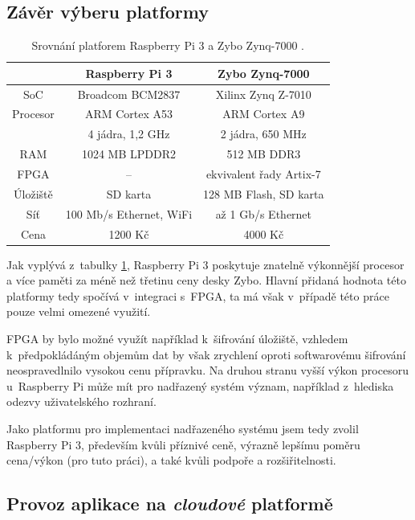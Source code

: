 \subsection{Závěr výberu platformy}

\begin{table}[h!]
\centering
\begin{tabular}{|c | c | c |} 
 \hline
 & \textbf{Raspberry Pi 3} & \textbf{Zybo Zynq-7000} \\
 \hline 
 SoC & Broadcom BCM2837 & Xilinx Zynq Z-7010 \\ 
 Procesor & ARM Cortex A53 & ARM Cortex A9 \\
 & 4 jádra, 1,2 GHz & 2 jádra, 650 MHz \\
 RAM & 1024 MB LPDDR2 & 512 MB DDR3 \\
 FPGA & -- & ekvivalent řady Artix-7 \\
 Úložiště & SD karta & 128 MB Flash, SD karta \\
 Síť & 100 Mb/s Ethernet, WiFi & až 1 Gb/s Ethernet \\
 Cena & 1200 Kč & 4000 Kč \\
 \hline
\end{tabular}
\caption[Srovnání platforem Raspberry Pi 3 a Zybo Zynq-7000]{Srovnání platforem Raspberry Pi 3 a Zybo Zynq-7000 \cite{rpi_benchoff, zybo_man}.}
\label{tab:plat_compare}
\end{table}

Jak vyplývá z~tabulky \ref{tab:plat_compare}, Raspberry Pi 3 poskytuje znatelně výkonnější procesor a více paměti za méně než třetinu ceny desky Zybo. Hlavní přidaná hodnota této platformy tedy spočívá v~integraci s~FPGA, ta má však v~případě této práce pouze velmi omezené využití. 

FPGA by bylo možné využít například k~šifrování úložiště, vzhledem k~předpokládáným objemům dat by však zrychlení oproti softwarovému šifrování neospravedlnilo vysokou cenu přípravku. Na druhou stranu vyšší výkon procesoru u~Raspberry Pi může mít pro nadřazený systém význam, například z~hlediska odezvy uživatelského rozhraní.

Jako platformu pro implementaci nadřazeného systému jsem tedy zvolil Raspberry Pi 3, především kvůli příznivé ceně, výrazně lepšímu poměru cena/výkon (pro tuto práci), a také kvůli podpoře a rozšiřitelnosti.

\subsection{Provoz aplikace na \textit{cloudové} platformě}
\label{sec:an_cloud}

